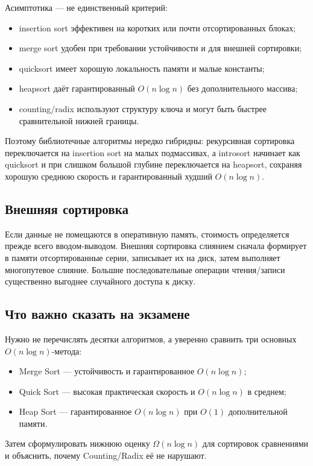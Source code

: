 Асимптотика --- не единственный критерий:
\begin{itemize}
    \item insertion sort эффективен на коротких или почти отсортированных блоках;
    \item merge sort удобен при требовании устойчивости и для внешней сортировки;
    \item quicksort имеет хорошую локальность памяти и малые константы;
    \item heapsort даёт гарантированный $O(n\log n)$ без дополнительного массива;
    \item counting/radix используют структуру ключа и могут быть быстрее
    сравнительной нижней границы.
\end{itemize}

Поэтому библиотечные алгоритмы нередко гибридны: рекурсивная сортировка
переключается на insertion sort на малых подмассивах, а introsort начинает как
quicksort и при слишком большой глубине переключается на heapsort, сохраняя
хорошую среднюю скорость и гарантированный худший $O(n\log n)$.

\subsection{Внешняя сортировка}

Если данные не помещаются в оперативную память, стоимость определяется прежде
всего вводом-выводом. Внешняя сортировка слиянием сначала формирует в памяти
отсортированные серии, записывает их на диск, затем выполняет многопутевое
слияние. Большие последовательные операции чтения/записи существенно выгоднее
случайного доступа к диску.


\subsection{Что важно сказать на экзамене}

Нужно не перечислять десятки алгоритмов, а уверенно сравнить три основных $O(n\log n)$-метода:
\begin{itemize}
\item Merge Sort --- устойчивость и гарантированное $O(n\log n)$;
\item Quick Sort --- высокая практическая скорость и $O(n\log n)$ в среднем;
\item Heap Sort --- гарантированное $O(n\log n)$ при $O(1)$ дополнительной памяти.
\end{itemize}
Затем сформулировать нижнюю оценку $\Omega(n\log n)$ для сортировок сравнениями и объяснить, почему Counting/Radix её не нарушают.

\newpage
